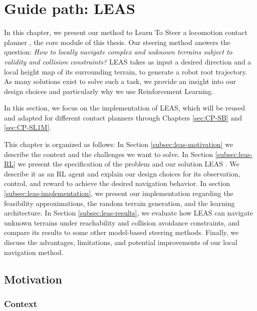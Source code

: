 

\chapter{Guide path: LEAS}
\label{sec:LEAS}
\minitoc
\bigskip

In this chapter, we present our method to Learn To Steer a locomotion contact planner , the core module of this thesis. 
Our steering method answers the question: \textit{How to locally navigate complex and unknown terrains subject to validity and collision constraints?}
LEAS takes as input a desired direction and a local height map of its surrounding terrain, to generate a robot root trajectory.
As many solutions exist to solve such a task, we provide an insight into our design choices and particularly why we use Reinforcement Learning.

In this section, we focus on the implementation of LEAS, which will be reused and adapted for different contact planners through Chapters \ref{sec:CP-SB} and \ref{sec:CP-SL1M}.

This chapter is organized as follows: 
In Section \ref{subsec:leas-motivation} we describe the context and the challenges we want to solve. In Section \ref{subsec:leas-RL} we present the specification of the problem and our solution LEAS \cite{LEAS}. We describe it as an RL agent and explain our design choices for its observation, control, and reward to achieve the desired navigation behavior.
In section \ref{subsec:leas-implementation}, we present our implementation regarding the feasibility approximations, the random terrain generation, and the learning architecture.
In Section \ref{subsec:leas-results}, we evaluate how LEAS can navigate unknown terrains under reachability and collision avoidance constraints, and compare its results to some other model-based steering methods.
Finally, we discuss the advantages, limitations, and potential improvements of our local navigation method.

\section{Motivation\label{subsec:leas-motivation}}
\subsection{Context\label{subsubsec:context}}

